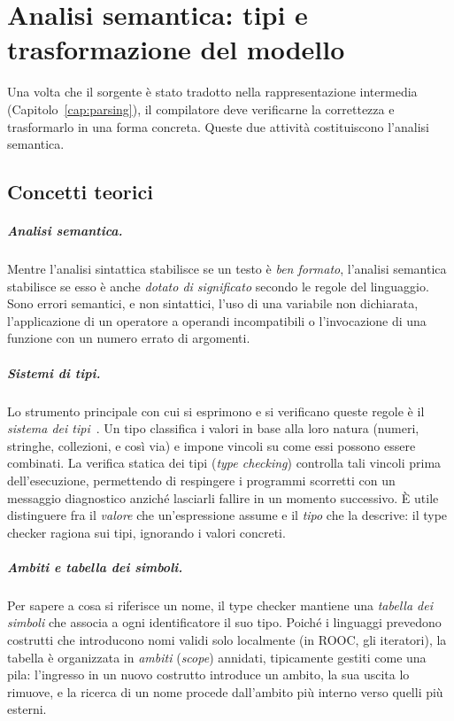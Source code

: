 
\chapter{Analisi semantica: tipi e trasformazione del modello}
\label{cap:semantica}

Una volta che il sorgente è stato tradotto nella rappresentazione intermedia
(Capitolo~\ref{cap:parsing}), il compilatore deve verificarne la correttezza e
trasformarlo in una forma concreta. Queste due attività costituiscono l'analisi
semantica.

\section{Concetti teorici}
\label{sec:semantica-teoria}

\paragraph{Analisi semantica.}
Mentre l'analisi sintattica stabilisce se un testo è \emph{ben formato},
l'analisi semantica stabilisce se esso è anche \emph{dotato di significato}
secondo le regole del linguaggio. Sono errori semantici, e non sintattici, l'uso
di una variabile non dichiarata, l'applicazione di un operatore a operandi
incompatibili o l'invocazione di una funzione con un numero errato di argomenti.

\paragraph{Sistemi di tipi.}
Lo strumento principale con cui si esprimono e si verificano queste regole è il
\emph{sistema dei tipi}~\cite{pierce2002}. Un tipo classifica i valori in base
alla loro natura (numeri, stringhe, collezioni, e così via) e impone vincoli su
come essi possono essere combinati. La verifica statica dei tipi (\emph{type
checking}) controlla tali vincoli prima dell'esecuzione, permettendo di
respingere i programmi scorretti con un messaggio diagnostico anziché lasciarli
fallire in un momento successivo. È utile distinguere fra il \emph{valore} che
un'espressione assume e il \emph{tipo} che la descrive: il type checker ragiona
sui tipi, ignorando i valori concreti.

\paragraph{Ambiti e tabella dei simboli.}
Per sapere a cosa si riferisce un nome, il type checker mantiene una
\emph{tabella dei simboli} che associa a ogni identificatore il suo tipo. Poiché
i linguaggi prevedono costrutti che introducono nomi validi solo localmente
(in ROOC, gli iteratori), la tabella è organizzata in \emph{ambiti} (\emph{scope})
annidati, tipicamente gestiti come una pila: l'ingresso in un nuovo costrutto
introduce un ambito, la sua uscita lo rimuove, e la ricerca di un nome procede
dall'ambito più interno verso quelli più esterni.


